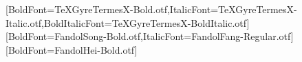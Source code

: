 \setmainfont{TeXGyreTermesX-Regular.otf}[BoldFont=TeXGyreTermesX-Bold.otf,ItalicFont=TeXGyreTermesX-Italic.otf,BoldItalicFont=TeXGyreTermesX-BoldItalic.otf]
[BoldFont=FandolSong-Bold.otf,ItalicFont=FandolFang-Regular.otf]
[BoldFont=FandolHei-Bold.otf]
